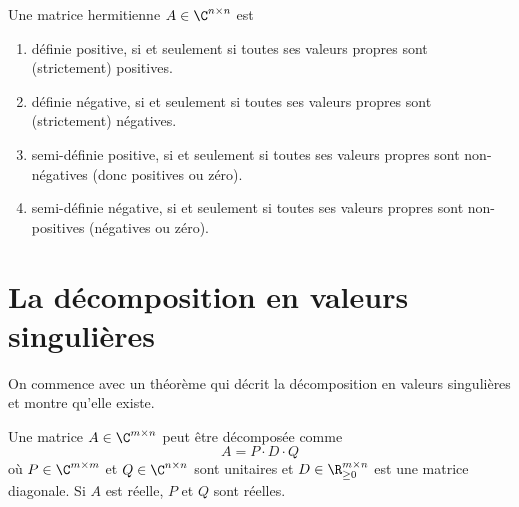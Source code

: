 \begin{theorem}
\label{thr:20}
  Une matrice hermitienne $A \in \C^{n \times n}$ est 
  \begin{enumerate}
  \item définie positive,
    si et seulement si toutes ses valeurs propres sont (strictement) positives. 
  \item définie négative,  si et seulement si toutes ses valeurs propres sont (strictement) négatives. 
  \item semi-définie positive, si et seulement si toutes ses valeurs propres sont non-négatives (donc positives ou zéro).  
  \item semi-définie négative, si et seulement si toutes ses valeurs propres sont non-positives (négatives ou zéro).  
  \end{enumerate}
\end{theorem}


\section{La décomposition en valeurs singulières}
\label{sec:la-decomposition-en}


On commence avec un théorème qui décrit la décomposition en valeurs singulières et montre qu'elle existe. 


\begin{theorem}
  \label{thr:21}
  Une matrice $A \in \C^{m \times n}$ peut être décomposée comme 
  \begin{displaymath}
    A = P\cdot D \cdot Q
  \end{displaymath}
où $P \in \C^{m \times m}$ et $Q \in \C^{n \times n}$ sont unitaires et $D \in \R_{\geq 0}^{m \times n}$ est une matrice diagonale. Si $A$ est réelle, $P$ et $Q$ sont réelles. 
\end{theorem}


